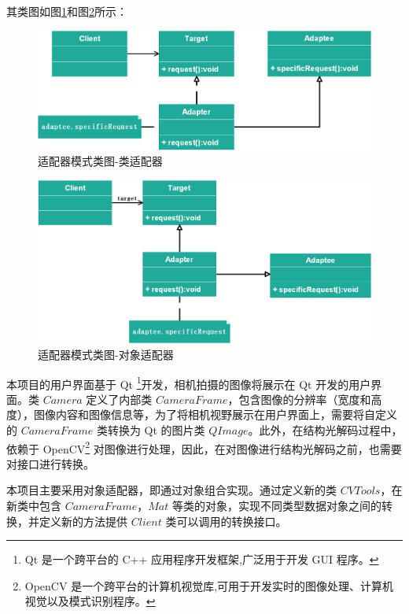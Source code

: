 \documentclass[article]{BJTU-thesis}
\begin{document}
其类图如图\ref{fig:fig2}和图\ref{fig:fig3}所示：

	 	\begin{figure}[!htbp]
	\centering
	\includegraphics[scale=0.5]{10.png}
	\caption{适配器模式类图-类适配器}
	\label{fig:fig2}
\end{figure}

	 	\begin{figure}[!htbp]
	\centering
	\includegraphics[scale=0.5]{11.png}
	\caption{适配器模式类图-对象适配器}
	\label{fig:fig3}
\end{figure}



本项目的用户界面基于 Qt \footnote{Qt 是一个跨平台的 C++ 应用程序开发框架,广泛用于开发 GUI 程序。}开发，相机拍摄的图像将展示在 Qt 开发的用户界面。类 $Camera$ 定义了内部类 $CameraFrame$，包含图像的分辨率（宽度和高度），图像内容和图像信息等，为了将相机视野展示在用户界面上，需要将自定义的 $CameraFrame$ 类转换为 Qt 的图片类 $QImage$。此外，在结构光解码过程中，依赖于 OpenCV\footnote{OpenCV 是一个跨平台的计算机视觉库,可用于开发实时的图像处理、计算机视觉以及模式识别程序。} 对图像进行处理，因此，在对图像进行结构光解码之前，也需要对接口进行转换。

本项目主要采用对象适配器，即通过对象组合实现。通过定义新的类 $CVTools$，在新类中包含 $CameraFrame$，$Mat$ 等类的对象，实现不同类型数据对象之间的转换，并定义新的方法提供 $Client$ 类可以调用的转换接口。
\end{document}
